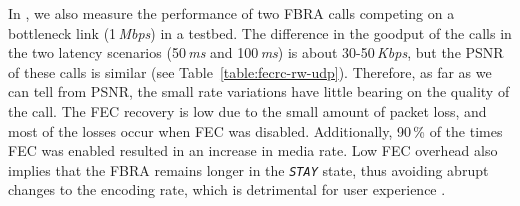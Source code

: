 In , we also measure the performance of two FBRA calls
competing on a bottleneck link (1\,\emph{Mbps}) in a testbed. The difference in the
goodput of the calls in the two latency scenarios (50\,\emph{ms} and
100\,\emph{ms}) is about 30-50\,\emph{Kbps}, but the PSNR of these calls is
similar (see Table~\ref{table:fecrc-rw-udp}). Therefore, as far as we can tell from
PSNR, the small rate variations have little bearing on the quality of the
call. The FEC recovery is low due to the small amount of packet loss, and most of
the losses occur when FEC was disabled. Additionally, 90\,\% of the times FEC
was enabled resulted in an increase in media rate. Low FEC overhead also
implies that the FBRA remains longer in the \texttt{\emph{STAY}} state, thus
avoiding abrupt changes to the encoding rate, which is detrimental for user
experience \cite{Zink03subjectiveimpression}.

\begin{table}
  \caption{An RTP flow sharing a bottleneck link with short TCP flows in an
  emulated testbed. Results are average of 10 runs.}
  \label{table:fecrc-rw-tcp}
\end{table}


